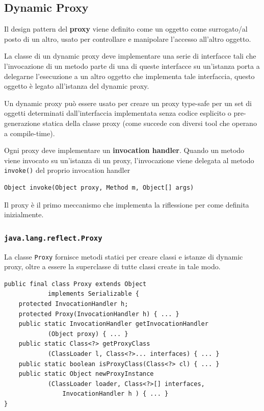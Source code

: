 \subsection{Dynamic Proxy}

Il design pattern del \textbf{proxy} viene definito come un oggetto come surrogato/al posto di un altro, usato per controllare e manipolare l'accesso all'altro oggetto.

La classe di un dynamic proxy deve implementare una serie di interfacce tali che l'invocazione di un metodo parte di una di queste interfacce su un'istanza porta a delegarne l'esecuzione a un altro oggetto che implementa tale interfaccia, questo oggetto è legato all'istanza del dynamic proxy.

Un dynamic proxy può essere usato per creare un proxy type-safe per un set di oggetti determinati dall'interfaccia implementata senza codice esplicito o pre-generazione statica della classe proxy (come succede con diversi tool che operano a compile-time).


Ogni proxy deve implementare un \textbf{invocation handler}. Quando un metodo viene invocato su un'istanza di un proxy, l'invocazione viene delegata al metodo \texttt{invoke()} del proprio invocation handler
\begin{verbatim}
Object invoke(Object proxy, Method m, Object[] args)
\end{verbatim}

Il proxy è il primo meccanismo che implementa la riflessione per come definita inizialmente.

\subsubsection{\texttt{java.lang.reflect.Proxy}}

La classe \texttt{Proxy} fornisce metodi statici per creare classi e istanze di dynamic proxy, oltre a essere la superclasse di tutte classi create in tale modo.
\begin{verbatim}
public final class Proxy extends Object
            implements Serializable {
    protected InvocationHandler h;
    protected Proxy(InvocationHandler h) { ... }
    public static InvocationHandler getInvocationHandler
            (Object proxy) { ... }
    public static Class<?> getProxyClass
            (ClassLoader l, Class<?>... interfaces) { ... }
    public static boolean isProxyClass(Class<?> cl) { ... }
    public static Object newProxyInstance
            (ClassLoader loader, Class<?>[] interfaces,
                InvocationHandler h ) { ... }
}
\end{verbatim}

